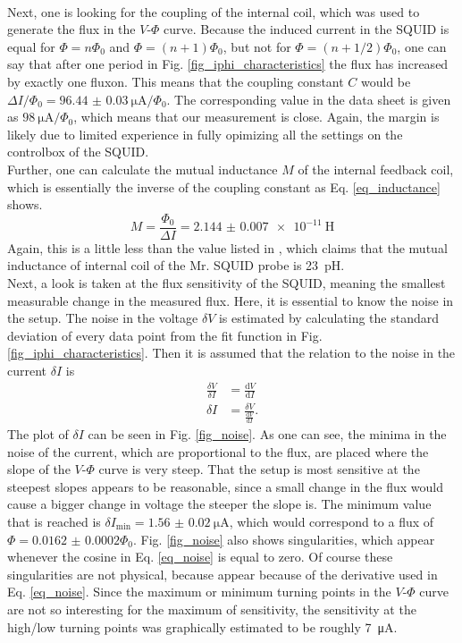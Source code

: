 \documentclass[a4paper,10pt]{article}
\newcommand{\dif}{\mathrm{d}}
\begin{document}
\\ %
Next, one is looking for the coupling of the internal coil, which was used to generate the flux in the $V$-$\Phi$ curve. Because the induced current in the SQUID is equal for $\Phi = n \Phi_0$ and $\Phi = (n + 1) \Phi_0$, but not for $\Phi = (n + 1/2) \Phi_0$, one can say that after one period in Fig. \ref{fig_iphi_characteristics} the flux has increased by exactly one fluxon. This means that the coupling constant $C$ would be $\Delta I / \Phi_0 = \SI{96.44(3)}{\micro \ampere} / \Phi_0$. The corresponding value in the data sheet \cite{datasheet} is given as $\SI{98}{\micro \ampere} / \Phi_0$, which means that our measurement is close. Again, the margin is likely due to limited experience in fully opimizing all the settings on the controlbox of the SQUID. 
\\
Further, one can calculate the mutual inductance $M$ of the internal feedback coil, which is essentially the inverse of the coupling constant as Eq. \ref{eq_inductance} shows. 
\begin{equation}
    \label{eq_inductance}
    M = \frac{\Phi_0}{\Delta I} = \SI{2.144(7)e-11}{\henry}
\end{equation}
Again, this is a little less than the value listed in \cite{skriptum}, which claims that the mutual inductance of internal coil of the Mr. SQUID probe is \SI{23}{\pico \henry}. \\
Next, a look is taken at the flux sensitivity of the SQUID, meaning the smallest measurable change in the measured flux. Here, it is essential to know the noise in the setup. The noise in the voltage $\delta V$ is estimated by calculating the standard deviation of every data point from the fit function in Fig. \ref{fig_iphi_characteristics}. Then it is assumed that the relation to the noise in the current $\delta I$ is 
\begin{equation}
    \begin{split}
        \label{eq_noise}
        \frac{\delta V}{\delta I} &= \frac{\dif V}{\dif I} \\
        \delta I &= \frac{\delta V}{\frac{\dif V}{\dif I}}. 
    \end{split}
\end{equation}
The plot of $\delta I$ can be seen in Fig. \ref{fig_noise}. As one can see, the minima in the noise of the current, which are proportional to the flux, are placed where the slope of the $V$-$\Phi$ curve is very steep. That the setup is most sensitive at the steepest slopes appears to be reasonable, since a small change in the flux would cause a bigger change in voltage the steeper the slope is. The minimum value that is reached is $\delta I_\mathrm{min} = \SI{1.56(2)}{\micro \ampere}$, which would correspond to a flux of $\Phi = \num{0.0162(2)} \Phi_0$. Fig. \ref{fig_noise} also shows singularities, which appear whenever the cosine in Eq. \ref{eq_noise} is equal to zero. Of course these singularities are not physical, because appear because of the derivative used in Eq. \ref{eq_noise}. Since the maximum or minimum turning points in the $V$-$\Phi$ curve are not so interesting for the maximum of sensitivity, the sensitivity at the high/low turning points was graphically estimated to be roughly \SI{7}{\micro \ampere}. 
\end{document}
